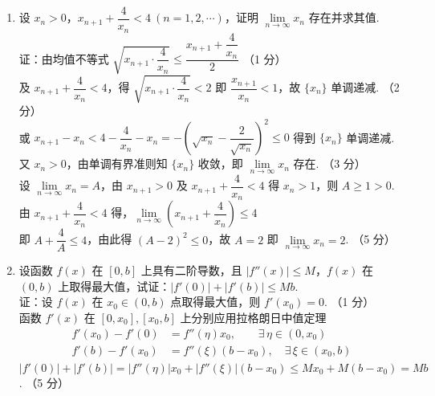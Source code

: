 \documentclass[a4paper,11pt]{ctexart}
\newcommand{\score}[1]{\hfill（#1）}
\begin{document}
\begin{enumerate}[label=\arabic*., start=16, leftmargin=2em, itemsep=1.0em, topsep=0.5em]
  \item 设 $x_n > 0$，$x_{n+1} + \dfrac{4}{x_n} < 4~(n = 1, 2, \cdots)$，证明 $\lim\limits_{n\to\infty} x_n$ 存在并求其值.\\[0.3em]
  证：由均值不等式 $\sqrt{x_{n+1}\cdot\dfrac{4}{x_n}} \le \dfrac{x_{n+1} + \dfrac{4}{x_n}}{2}$ \score{1 分}\\[0.3em]
  及 $x_{n+1} + \dfrac{4}{x_n} < 4$，得 $\sqrt{x_{n+1}\cdot\dfrac{4}{x_n}} < 2$ 即 $\dfrac{x_{n+1}}{x_n} < 1$，故 $\{x_n\}$ 单调递减. \score{2 分}\\[0.3em]
  或 $x_{n+1} - x_n < 4 - \dfrac{4}{x_n} - x_n = -\left(\sqrt{x_n} - \dfrac{2}{\sqrt{x_n}}\right)^2 \le 0$ 得到 $\{x_n\}$ 单调递减.\\[0.2em]
  又 $x_n > 0$，由单调有界准则知 $\{x_n\}$ 收敛，即 $\lim\limits_{n\to\infty} x_n$ 存在. \score{3 分}\\[0.2em]
  设 $\lim\limits_{n\to\infty} x_n = A$，由 $x_{n+1} > 0$ 及 $x_{n+1} + \dfrac{4}{x_n} < 4$ 得 $x_n > 1$，则 $A \ge 1 > 0$. 由 $x_{n+1} + \dfrac{4}{x_n} < 4$ 得，$\lim\limits_{n\to\infty}\left(x_{n+1} + \dfrac{4}{x_n}\right) \le 4$\\[0.2em]
  即 $A + \dfrac{4}{A} \le 4$，由此得 $(A - 2)^2 \le 0$，故 $A = 2$ 即 $\lim\limits_{n\to\infty} x_n = 2$. \score{5 分}

  \item 设函数 $f(x)$ 在 $[0, b]$ 上具有二阶导数，且 $|f''(x)| \le M$，$f(x)$ 在 $(0, b)$ 上取得最大值，试证：$|f'(0)| + |f'(b)| \le Mb$.\\[0.3em]
  证：设 $f(x)$ 在 $x_0 \in (0, b)$ 点取得最大值，则 $f'(x_0) = 0$. \score{1 分}\\[0.2em]
  函数 $f'(x)$ 在 $[0, x_0],[x_0, b]$ 上分别应用拉格朗日中值定理
  \begin{align*}
    f'(x_0) - f'(0) &= f''(\eta)x_0, \qquad \exists\,\eta\in(0, x_0) \\
    f'(b) - f'(x_0) &= f''(\xi)(b - x_0), \quad \exists\,\xi\in(x_0, b) \tag*{（3 分）}
  \end{align*}
  $|f'(0)| + |f'(b)| = |f''(\eta)|x_0 + |f''(\xi)|(b - x_0) \le Mx_0 + M(b - x_0) = Mb$. \score{5 分}
\end{enumerate}
\end{document}
